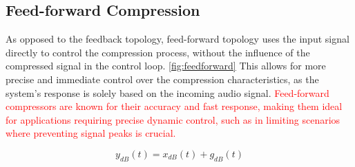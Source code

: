 \documentclass[10pt]{article}
\begin{document}
\begin{multicols*}{2}
\begin{minipage}{\linewidth}
                            
                        \label{fig:feedback}
                    
                    \end{minipage}
                
            \subsection{Feed-forward Compression}
                As opposed to the feedback topology, feed-forward topology uses the input signal directly to control the compression process, without the influence of the compressed signal in the control loop. \ref{fig:feedforward} This allows for more precise and immediate control over the compression characteristics, as the system's response is solely based on the incoming audio signal. \textcolor{red}{Feed-forward compressors are known for their accuracy and fast response, making them ideal for applications requiring precise dynamic control, such as in limiting scenarios where preventing signal peaks is crucial.}\par

                \begin{equation}\label{eq:feedforward}
                    y_{dB}(t)=x_{dB}(t)+g_{dB}(t)
                \end{equation}

                    \noindent
                    \begin{minipage}{\linewidth}


\end{minipage}
\end{multicols*}
\end{document}
